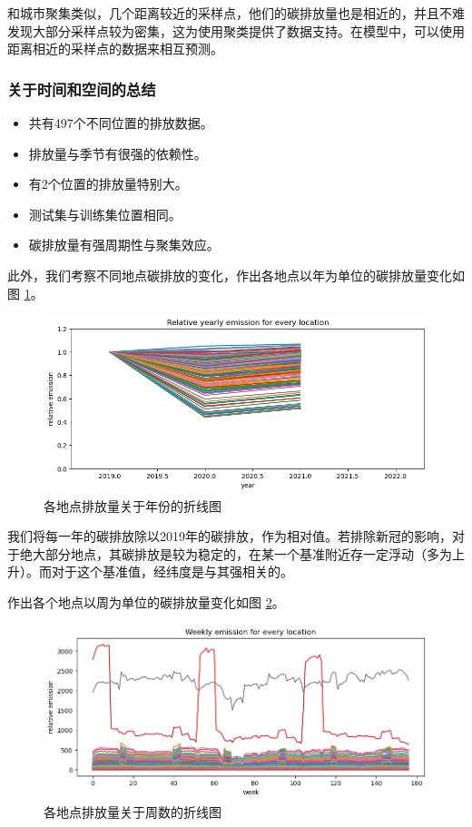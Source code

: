 \documentclass{ctexart}
\begin{document}
\begin{sloppypar}
和城市聚集类似，几个距离较近的采样点，他们的碳排放量也是相近的，并且不难发现大部分采样点较为密集，这为使用聚类提供了数据支持。在模型中，可以使用距离相近的采样点的数据来相互预测。

\subsubsection{关于时间和空间的总结}

\begin{itemize}
      \item 共有497个不同位置的排放数据。
      \item 排放量与季节有很强的依赖性。
      \item 有2个位置的排放量特别大。
      \item 测试集与训练集位置相同。
      \item 碳排放量有强周期性与聚集效应。
\end{itemize}

此外，我们考察不同地点碳排放的变化，作出各地点以年为单位的碳排放量变化如图 \ref{fig:5}。

\begin{figure}[H]
      \centering
      \includegraphics[width=1\textwidth]{output5.png}
      \caption{各地点排放量关于年份的折线图}
      \label{fig:5}
\end{figure}

我们将每一年的碳排放除以2019年的碳排放，作为相对值。若排除新冠的影响，对于绝大部分地点，其碳排放是较为稳定的，在某一个基准附近存一定浮动（多为上升）。而对于这个基准值，经纬度是与其强相关的。

作出各个地点以周为单位的碳排放量变化如图 \ref{fig:8}。

\begin{figure}[H]
      \centering
      \includegraphics[width=1\textwidth]{output8.png}
      \caption{各地点排放量关于周数的折线图}
      \label{fig:8}
\end{figure}


\end{sloppypar}
\end{document}
